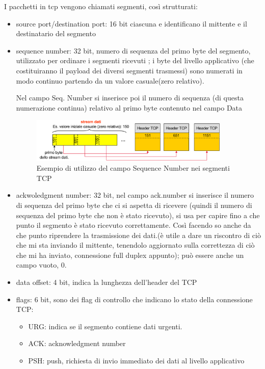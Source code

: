 I pacchetti in tcp vengono chiamati segmenti, così strutturati:
\begin{itemize}
    \item source port/destination port: 16 bit ciascuna e identificano il mittente e il destinatario del segmento
    \item sequence number: 32 bit, numero di sequenza del primo byte del segmento, utilizzato per ordinare i segmenti ricevuti ; i byte del livello applicativo (che costituiranno il payload dei
diversi segmenti trasmessi) sono numerati in modo continuo partendo da un valore casuale(zero relativo). 

Nel campo Seq. Number si inserisce poi il numero di sequenza (di questa numerazione continua)
relativo al primo byte contenuto nel campo Data
\begin{figure}[h!]
    \centering
    \includegraphics[width=0.9\textwidth]{images/sequence_number.png}
    \caption{Esempio di utilizzo del campo Sequence Number nei segmenti TCP}
    \label{fig:sequencenumber}
\end{figure}
    \item ackwoledgment number: 32 bit, nel campo ack.number si inserisce il numero di sequenza del primo byte che ci si aspetta di ricevere (quindi il numero di sequenza del primo byte che non è stato ricevuto), si usa per capire fino a che punto il segmento è stato ricevuto correttamente. Così facendo so anche da che punto riprendere la trasmissione dei dati.(è utile a dare un riscontro di ciò che mi sta inviando il mittente, tenendolo aggiornato sulla correttezza di ciò che mi ha inviato, connessione full duplex appunto); può essere anche un campo vuoto, 0.
    \item data offset: 4 bit, indica la lunghezza dell'header del TCP
    \item flags: 6 bit, sono dei flag di controllo che indicano lo stato della connessione TCP:
    \begin{itemize}
        \item URG: indica se il segmento contiene dati urgenti.
        \item ACK: acknowledgment number
        \item PSH: push, richiesta di invio immediato dei dati al livello applicativo

\end{itemize}
\end{itemize}
